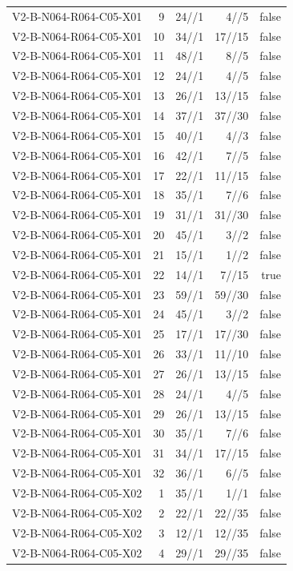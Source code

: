 {\begin{longtable}{lrrrr}
V2-B-N064-R064-C05-X01 & 9 & 24//1 & 4//5 & false \\
V2-B-N064-R064-C05-X01 & 10 & 34//1 & 17//15 & false \\
V2-B-N064-R064-C05-X01 & 11 & 48//1 & 8//5 & false \\
V2-B-N064-R064-C05-X01 & 12 & 24//1 & 4//5 & false \\
V2-B-N064-R064-C05-X01 & 13 & 26//1 & 13//15 & false \\
V2-B-N064-R064-C05-X01 & 14 & 37//1 & 37//30 & false \\
V2-B-N064-R064-C05-X01 & 15 & 40//1 & 4//3 & false \\
V2-B-N064-R064-C05-X01 & 16 & 42//1 & 7//5 & false \\
V2-B-N064-R064-C05-X01 & 17 & 22//1 & 11//15 & false \\
V2-B-N064-R064-C05-X01 & 18 & 35//1 & 7//6 & false \\
V2-B-N064-R064-C05-X01 & 19 & 31//1 & 31//30 & false \\
V2-B-N064-R064-C05-X01 & 20 & 45//1 & 3//2 & false \\
V2-B-N064-R064-C05-X01 & 21 & 15//1 & 1//2 & false \\
V2-B-N064-R064-C05-X01 & 22 & 14//1 & 7//15 & true \\
V2-B-N064-R064-C05-X01 & 23 & 59//1 & 59//30 & false \\
V2-B-N064-R064-C05-X01 & 24 & 45//1 & 3//2 & false \\
V2-B-N064-R064-C05-X01 & 25 & 17//1 & 17//30 & false \\
V2-B-N064-R064-C05-X01 & 26 & 33//1 & 11//10 & false \\
V2-B-N064-R064-C05-X01 & 27 & 26//1 & 13//15 & false \\
V2-B-N064-R064-C05-X01 & 28 & 24//1 & 4//5 & false \\
V2-B-N064-R064-C05-X01 & 29 & 26//1 & 13//15 & false \\
V2-B-N064-R064-C05-X01 & 30 & 35//1 & 7//6 & false \\
V2-B-N064-R064-C05-X01 & 31 & 34//1 & 17//15 & false \\
V2-B-N064-R064-C05-X01 & 32 & 36//1 & 6//5 & false \\
V2-B-N064-R064-C05-X02 & 1 & 35//1 & 1//1 & false \\
V2-B-N064-R064-C05-X02 & 2 & 22//1 & 22//35 & false \\
V2-B-N064-R064-C05-X02 & 3 & 12//1 & 12//35 & false \\
V2-B-N064-R064-C05-X02 & 4 & 29//1 & 29//35 & false \\

\end{longtable}}
